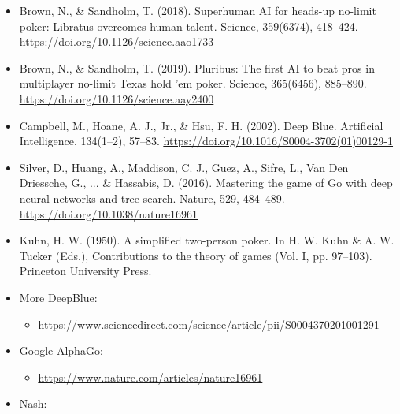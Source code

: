 \documentclass[
]{article}
\begin{document}
\begin{itemize}
\item
  Brown, N., \& Sandholm, T. (2018). Superhuman AI for heads-up no-limit
  poker: Libratus overcomes human talent. Science, 359(6374), 418--424.
  \href{https://doi.org/10.1126/science.aao1733}{\ul{https://doi.org/10.1126/science.aao1733}}
\item
  Brown, N., \& Sandholm, T. (2019). Pluribus: The first AI to beat pros
  in multiplayer no-limit Texas hold 'em poker. Science, 365(6456),
  885--890.
  \href{https://doi.org/10.1126/science.aay2400}{\ul{https://doi.org/10.1126/science.aay2400}}
\item
  Campbell, M., Hoane, A. J., Jr., \& Hsu, F. H. (2002). Deep Blue.
  Artificial Intelligence, 134(1--2), 57--83.
  \href{https://doi.org/10.1016/S0004-3702(01)00129-1}{\ul{https://doi.org/10.1016/S0004-3702(01)00129-1}}
\item
  Silver, D., Huang, A., Maddison, C. J., Guez, A., Sifre, L., Van Den
  Driessche, G., ... \& Hassabis, D. (2016). Mastering the game of Go
  with deep neural networks and tree search. Nature, 529, 484--489.
  \href{https://doi.org/10.1038/nature16961}{\ul{https://doi.org/10.1038/nature16961}}
\item
  Kuhn, H. W. (1950). A simplified two-person poker. In H. W. Kuhn \& A.
  W. Tucker (Eds.), Contributions to the theory of games (Vol. I, pp.
  97--103). Princeton University Press.
\item
  More DeepBlue:

  \begin{itemize}
  \item
    \href{https://www.sciencedirect.com/science/article/pii/S0004370201001291}{\ul{https://www.sciencedirect.com/science/article/pii/S0004370201001291}}
  \end{itemize}
\item
  Google AlphaGo:

  \begin{itemize}
  \item
    \href{https://www.nature.com/articles/nature16961}{\ul{https://www.nature.com/articles/nature16961}}
  \end{itemize}
\item
  Nash:


\end{itemize}
\end{document}
